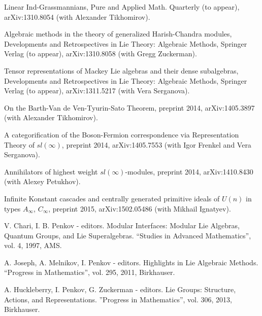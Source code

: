 \myss \label{59.} Linear Ind-Grassmannians, Pure and Applied Math. Quarterly (to appear), arXiv:1310.8054 (with Alexander Tikhomirov).

\myss \label{60.} Algebraic methods in the theory of generalized Harish-Chandra modules, Developments and Retrospectives in Lie Theory: Algebraic Methods, Springer Verlag (to appear), arXiv:1310.8058 (with Gregg Zuckerman).

\myss \label{61.} Tensor representations of Mackey Lie algebras and their dense subalgebras, Developments and Retrospectives in Lie Theory: Algebraic Methods, Springer Verlag (to appear), arXiv:1311.5217 (with Vera Serganova).


\myss \label{62.} On the Barth-Van de Ven-Tyurin-Sato Theorem, preprint 2014, arXiv:1405.3897 (with Alexander Tikhomirov).

\myss \label{63.} A categorification of the Boson-Fermion correspondence via Representation Theory of $sl(\infty)$, preprint 2014, arXiv:1405.7553 (with Igor Frenkel and Vera Serganova).

\myss \label{64.}  Annihilators of highest weight $sl(\infty)$-modules, preprint 2014, arXiv:1410.8430 (with Alexey Petukhov).

\myss \label{65.} Infinite Konstant cascades and centrally generated primitive ideals of $U(n)$ in types $A_\infty$, $C_\infty$, preprint 2015, arXiv:1502.05486 (with Mikhail Ignatyev).

\vspace*{1cm}


\medskip

\myss \label{1.} V. Chari, I. B. Penkov - editors. Modular Interfaces: Modular Lie Algebras,
Quantum Groups, and Lie Superalgebras. ``Studies in Advanced Mathematics'', vol. 4, 1997, AMS. 

\myss \label{2.} A. Joseph, A. Melnikov, I. Penkov - editors. Highlights in Lie Algebraic Methods. ``Progress
in Mathematics'', vol. 295, 2011,  Birkhauser.

\myss \label{3.} A. Huckleberry, I. Penkov, G. Zuckerman - editors. Lie Groups: Structure, Actions, and Representations. ''Progress in Mathematics'', vol. 306, 2013, Birkhauser.


